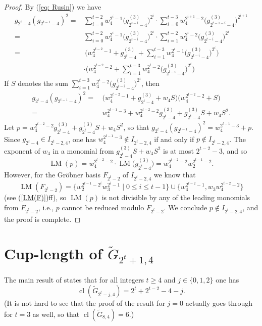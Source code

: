 \documentclass{amsart}
\theoremstyle{definition}
\theoremstyle{remark}
\numberwithin{equation}{section}
\newcommand{\gr}{\widetilde G}
\newcommand{\lm}{\operatorname{LM}}
\newcommand{\cl}{\operatorname{cl}}
\renewcommand{\le}{\leqslant}
\renewcommand{\ge}{\geqslant}
\begin{document}
\begin{proof}
By (\ref{eq: Rusin}) we have
\begin{align*}
  g_{2^t-4}(g_{2^{t-1}-4})^2 = &\sum_{i= 0}^{t-2}w_4^{2^i-1}\big(g_{2^{t-i}-4} ^{(3)}\big)^{2^i}\cdot \sum_{i= 0}^{t-3}w_4^{2^{i+1}-2}\big(g_{2^{t-1-i}-4} ^{(3)}\big)^{2^{i+1}}\\
  =&\sum_{i= 0}^{t-2}w_4^{2^i-1}\big(g_{2^{t-i}-4} ^{(3)}\big)^{2^i}\cdot \sum_{i= 1}^{t-2}w_4^{2^i-2}\big(g_{2^{t-i}-4}^{(3)}\big)^{2^i}\\
  =&\,\bigg(w_4^{2^{t-2}-1}+g_{2^t-4}^{(3)}+\sum_{i= 1}^{t-3}w_4^{2^i-1}\big(g_{2^{t-i}-4}^{(3)}\big)^{2^i}\bigg)\\
  &\cdot\bigg(w_4^{2^{t-2}-2}+\sum_{i= 1}^{t-3}w_4^{2^i-2}\big(g_{2^{t-i}-4}^{(3)}\big)^{2^i}\bigg)
\end{align*}
If $S$ denotes the sum $\sum_{i= 1}^{t-3}w_4^{2^i-2}\big(g_{2^{t-i}-4}^{(3)}\big)^{2^i}$, then
\begin{align*}
  g_{2^t-4}(g_{2^{t-1}-4})^2 = &\,\big(w_4^{2^{t-2}-1}+g_{2^t-4}^{(3)}+w_4S\big)\big(w_4^{2^{t-2}-2}+S\big)\\
  = &\,w_4^{2^{t-1}-3}+w_4^{2^{t-2}-2}g_{2^t-4}^{(3)}+g_{2^t-4}^{(3)}S+w_4S^2.
\end{align*}
Let $p=w_4^{2^{t-2}-2}g_{2^t-4}^{(3)}+g_{2^t-4}^{(3)}S+w_4S^2$, so that $g_{2^t-4}(g_{2^{t-1}-4})^2 =w_4^{2^{t-1}-3}+p$. Since $g_{2^t-4}\in I_{2^t-2,4}$, one has $w_4^{2^{t-1}-3}\notin I_{2^t-2,4}$ if and only if $p\notin I_{2^t-2,4}$. The exponent of $w_4$ in a monomial from $g_{2^t-4}^{(3)}S+w_4S^2$ is at most $2^{t-2}-3$, and so 
\[\lm(p)=w_4^{2^{t-2}-2}\cdot\lm\big(g_{2^t-4}^{(3)}\big)=w_4^{2^{t-2}-2}w_2^{2^{t-1}-2}.\]
However, for the Gr\"obner basis $F_{2^t-2}$ of $I_{2^t-2,4}$ we know that
\[\lm(F_{2^t-2})=\big\{w_2^{2^{t-1}-2^i}w_3^{2^i-1}\mid 0\le i\le t-1\big\}\cup\big\{w_4^{2^{t-2}-1},w_3w_4^{2^{t-2}-2}\big\}\]
(see (\ref{LM(F)})ff), so $\lm(p)$ is not divisible by any of the leading monomials from $F_{2^t-2}$, i.e., $p$ cannot be reduced modulo $F_{2^t-2}$. We conclude $p\notin I_{2^t-2,4}$, and the proof is complete.
\end{proof}


\section{Cup-length of $\gr_{2^t+1,4}$}
\label{sec:cl}
\label{sec:4}

The main result of \cite{Rusin} states that for all integers $t\ge4$ and $j\in\{0,1,2\}$ one has 
\[\cl(\gr_{2^t-j,4})=2^t+2^{t-2}-4-j.\]
(It is not hard to see that the proof of the result for $j=0$ actually goes through for $t=3$ as well, so that $\cl(\gr_{8,4})=6$.)
\end{document}
